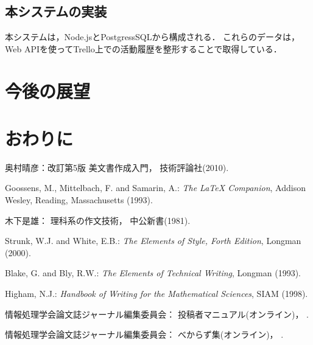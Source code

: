 \documentclass[submit,techrep]{ipsj}
\begin{document}
\subsection{本システムの実装}

本システムは，Node.jsとPostgressSQLから構成される．
これらのデータは，Web APIを使ってTrello上での活動履歴を整形することで取得している．

\section{今後の展望}

\section{おわりに}

\begin{thebibliography}{9}
奥村晴彦：改訂第5版 \LaTeXe 美文書作成入門，
技術評論社(2010).

Goossens, M., Mittelbach, F. and Samarin, A.: {\it The LaTeX Companion},
Addison Wesley, Reading, Massachusetts (1993).

木下是雄：
理科系の作文技術，
中公新書(1981).

Strunk, W.J. and White, E.B.: {\it The Elements of Style, Forth Edition},
Longman (2000).

Blake, G. and Bly, R.W.: {\it The Elements of Technical Writing},
Longman (1993).

Higham, N.J.:
{\it Handbook of Writing for the Mathematical Sciences},
SIAM (1998).

情報処理学会論文誌ジャーナル編集委員会：
投稿者マニュアル(オンライン)，
%
.

情報処理学会論文誌ジャーナル編集委員会：
べからず集(オンライン)，
%
.

\end{thebibliography}

\begin{biography}
%
%
\end{biography}
\end{document}
